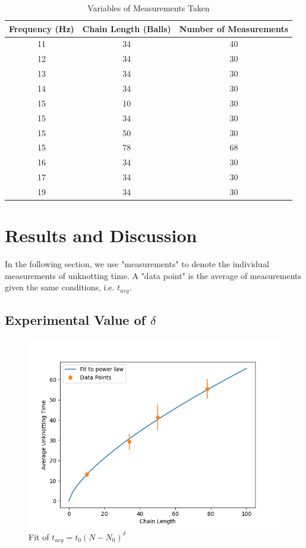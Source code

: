 \documentclass[12pt]{IEEEtran}
\begin{document}
\begin{table}
    \begin{tabular}{|c|c|c|}
        \hline
        Frequency (Hz) & Chain Length (Balls) & Number of Measurements \\
        \hline\hline
        11 & 34 & 40 \\
        \hline
        12 & 34 & 30 \\
        \hline
        13 & 34 & 30 \\
        \hline
        14 & 34 & 30 \\
        \hline
        15 & 10 & 30 \\
        \hline
        15 & 34 & 30 \\
        \hline
        15 & 50 & 30 \\
        \hline
        15 & 78 & 68 \\
        \hline
        16 & 34 & 30 \\
        \hline
        17 & 34 & 30 \\
        \hline
        19 & 34 & 30 \\
        \hline
    \end{tabular}
    \caption{Variables of Measurements Taken}\label{part1}
\end{table}

\section{Results and Discussion}

In the following section, we use "measurements" to denote the individual measurements of unknotting time. A "data point" is the average of measurements given the same conditions, i.e. $t_{avg}$.

\subsection{Experimental Value of $\delta$}

\begin{figure}[h]
    \centering
    \includegraphics[scale=0.5]{part1_plot.png}
    \caption{Fit of $t_{avg} = t_0(N - N_0)^\delta$}
\end{figure}
\end{document}
